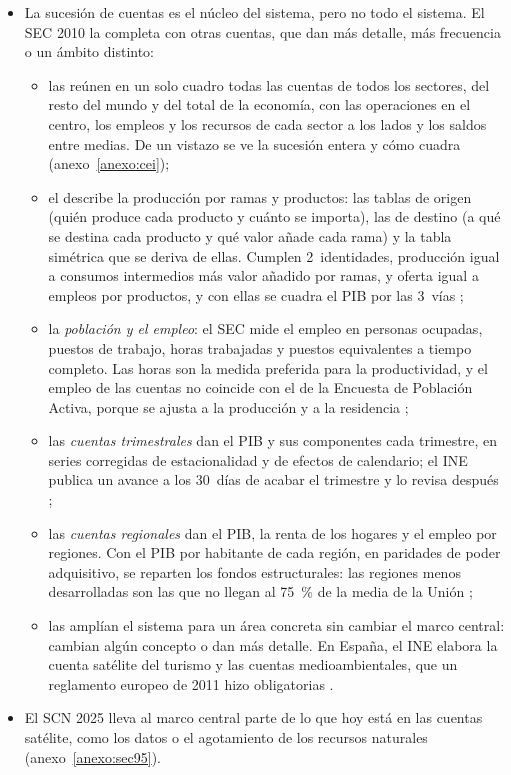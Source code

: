 \documentclass[11pt]{article}
\begin{document}
\begin{itemize}
\item La sucesión de cuentas es el núcleo del sistema, pero no todo el sistema. El SEC 2010 la completa con otras cuentas, que dan más detalle, más frecuencia o un ámbito distinto:
  \begin{itemize}
  \item las  reúnen en un solo cuadro todas las cuentas de todos los sectores, del resto del mundo y del total de la economía, con las operaciones en el centro, los empleos y los recursos de cada sector a los lados y los saldos entre medias. De un vistazo se ve la sucesión entera y cómo cuadra\nocite{SEC2010} (anexo~\ref{anexo:cei});
  \item el  describe la producción por ramas y productos: las tablas de origen (quién produce cada producto y cuánto se importa), las de destino (a qué se destina cada producto y qué valor añade cada rama) y la tabla simétrica que se deriva de ellas. Cumplen 2~identidades, producción igual a consumos intermedios más valor añadido por ramas, y oferta igual a empleos por productos, y con ellas se cuadra el PIB por las 3~vías\nocite{SEC2010} ;
  \item la \emph{población y el empleo}: el SEC mide el empleo en personas ocupadas, puestos de trabajo, horas trabajadas y puestos equivalentes a tiempo completo\nocite{SEC2010}. Las horas son la medida preferida para la productividad, y el empleo de las cuentas no coincide con el de la Encuesta de Población Activa, porque se ajusta a la producción y a la residencia ;
  \item las \emph{cuentas trimestrales} dan el PIB y sus componentes cada trimestre, en series corregidas de estacionalidad y de efectos de calendario; el INE publica un avance a los 30~días de acabar el trimestre y lo revisa después\nocite{SEC2010,INE2026avCNTR3T26} ;
  \item las \emph{cuentas regionales} dan el PIB, la renta de los hogares y el empleo por regiones\nocite{SEC2010}. Con el PIB por habitante de cada región, en paridades de poder adquisitivo, se reparten los fondos estructurales: las regiones menos desarrolladas son las que no llegan al 75~\% de la media de la Unión\nocite{RegUE2021Disposiciones} ;
  \item las  amplían el sistema para un área concreta sin cambiar el marco central: cambian algún concepto o dan más detalle\nocite{SEC2010}. En España, el INE elabora la cuenta satélite del turismo y las cuentas medioambientales, que un reglamento europeo de 2011 hizo obligatorias\nocite{RegUE2011Ambientales} .
  \end{itemize}
\item El SCN 2025 lleva al marco central parte de lo que hoy está en las cuentas satélite, como los datos o el agotamiento de los recursos naturales (anexo~\ref{anexo:sec95}).
\end{itemize}
\end{document}
